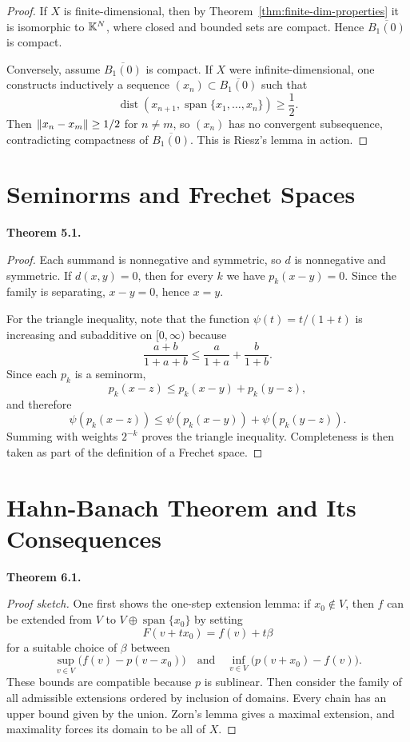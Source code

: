 \documentclass[11pt]{article}
\newcommand{\Ball}{\overline{B_1(0)}}
\newenvironment{theoremstmt}[1]{%
  \par\medskip\noindent\textbf{Theorem #1. }\itshape
}{\par\medskip}
\begin{document}
\begin{proof}
If $X$ is finite-dimensional, then by Theorem~\ref{thm:finite-dim-properties} it is isomorphic to $\mathbb{K}^N$, where closed and bounded sets are compact. Hence $\Ball$ is compact.

Conversely, assume $\Ball$ is compact. If $X$ were infinite-dimensional, one constructs inductively a sequence $(x_n)\subset\Ball$ such that
\[
\operatorname{dist}(x_{n+1},\operatorname{span}\{x_1,\dots,x_n\})\ge \frac12.
\]
Then $\left\lVert x_n-x_m\right\rVert\ge 1/2$ for $n\neq m$, so $(x_n)$ has no convergent subsequence, contradicting compactness of $\Ball$. This is Riesz's lemma in action.
\end{proof}

\section{Seminorms and Frechet Spaces}

\begin{theoremstmt}{5.1}
\thmFrechetMetric
\end{theoremstmt}

\begin{proof}
Each summand is nonnegative and symmetric, so $d$ is nonnegative and symmetric. If $d(x,y)=0$, then for every $k$ we have $p_k(x-y)=0$. Since the family is separating, $x-y=0$, hence $x=y$.

For the triangle inequality, note that the function $\psi(t)=t/(1+t)$ is increasing and subadditive on $[0,\infty)$ because
\[
\frac{a+b}{1+a+b}\le \frac{a}{1+a}+\frac{b}{1+b}.
\]
Since each $p_k$ is a seminorm,
\[
p_k(x-z)\le p_k(x-y)+p_k(y-z),
\]
and therefore
\[
\psi(p_k(x-z))\le \psi(p_k(x-y)) + \psi(p_k(y-z)).
\]
Summing with weights $2^{-k}$ proves the triangle inequality. Completeness is then taken as part of the definition of a Frechet space.
\end{proof}

\section{Hahn-Banach Theorem and Its Consequences}

\begin{theoremstmt}{6.1}
\thmHahnBanachReal
\end{theoremstmt}

\begin{proof}[Proof sketch]
One first shows the one-step extension lemma: if $x_0\notin V$, then $f$ can be extended from $V$ to $V\oplus \operatorname{span}\{x_0\}$ by setting
\[
F(v+tx_0)=f(v)+t\beta
\]
for a suitable choice of $\beta$ between
\[
\sup_{v\in V}\bigl(f(v)-p(v-x_0)\bigr)
\quad\text{and}\quad
\inf_{v\in V}\bigl(p(v+x_0)-f(v)\bigr).
\]
These bounds are compatible because $p$ is sublinear. Then consider the family of all admissible extensions ordered by inclusion of domains. Every chain has an upper bound given by the union. Zorn's lemma gives a maximal extension, and maximality forces its domain to be all of $X$.
\end{proof}
\end{document}
